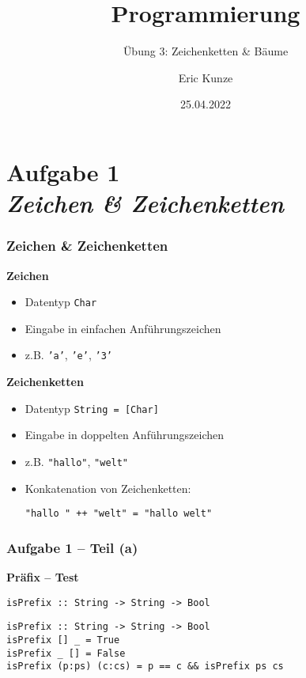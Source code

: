 \documentclass{beamer}
\begin{document}
	
	\title{Programmierung}
	\subtitle{Übung 3: Zeichenketten \& Bäume}
	\author{Eric Kunze}
	\date{25.04.2022}
	
	\maketitle



\section{Aufgabe 1 \\ \textit{\normalsize Zeichen \& Zeichenketten}}

	\begin{frame}[fragile] \frametitle{Zeichen \& Zeichenketten}
		\textbf{Zeichen}
		\begin{itemize}
			\item Datentyp \texttt{Char}
			\item Eingabe in einfachen Anführungszeichen
			\item z.B. \texttt{'a'}, \texttt{'e'}, \texttt{'3'}
		\end{itemize}
		\pause
		\textbf{Zeichenketten}
		\begin{itemize}
			\item Datentyp \texttt{String = [Char]}
			\item Eingabe in doppelten Anführungszeichen
			\item z.B. \texttt{"hallo"}, \texttt{"welt"}
			\item Konkatenation von Zeichenketten: \\[6pt] 
			\begin{lstlisting}[style=bg]
"hallo " ++ "welt" = "hallo welt"
			\end{lstlisting}
		\end{itemize}
	\end{frame}

\begin{frame}[t, fragile] \frametitle{Aufgabe 1 -- Teil (a)}
	\textbf{Präfix -- Test}
	
	\texttt{isPrefix :: String -> String -> Bool}
	
	\pause \bigskip
	
	\begin{lstlisting}[style=bg]
isPrefix :: String -> String -> Bool
isPrefix [] _ = True
isPrefix _ [] = False
isPrefix (p:ps) (c:cs) = p == c && isPrefix ps cs
	\end{lstlisting}
\end{frame}
\end{document}
